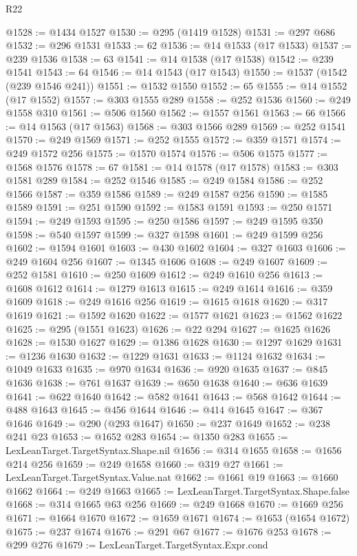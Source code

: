 \begin{lexlean}{R22}
\begin{coremodule}
@1528 := @1434 @1527
@1530 := @295 (@1419 @1528)
@1531 := @297 @686
@1532 := @296 @1531
@1533 := 62
@1536 := @14 @1533 (@17 @1533)
@1537 := @239 @1536
@1538 := 63
@1541 := @14 @1538 (@17 @1538)
@1542 := @239 @1541
@1543 := 64
@1546 := @14 @1543 (@17 @1543)
@1550 := @1537 (@1542 (@239 @1546 @241))
@1551 := @1532 @1550
@1552 := 65
@1555 := @14 @1552 (@17 @1552)
@1557 := @303 @1555 @289
@1558 := @252 @1536
@1560 := @249 @1558 @310
@1561 := @506 @1560
@1562 := @1557 @1561
@1563 := 66
@1566 := @14 @1563 (@17 @1563)
@1568 := @303 @1566 @289
@1569 := @252 @1541
@1570 := @249 @1569
@1571 := @252 @1555
@1572 := @359 @1571
@1574 := @249 @1572 @256
@1575 := @1570 @1574
@1576 := @506 @1575
@1577 := @1568 @1576
@1578 := 67
@1581 := @14 @1578 (@17 @1578)
@1583 := @303 @1581 @289
@1584 := @252 @1546
@1585 := @249 @1584
@1586 := @252 @1566
@1587 := @359 @1586
@1589 := @249 @1587 @256
@1590 := @1585 @1589
@1591 := @251 @1590
@1592 := @1583 @1591
@1593 := @250 @1571
@1594 := @249 @1593
@1595 := @250 @1586
@1597 := @249 @1595 @350
@1598 := @540 @1597
@1599 := @327 @1598
@1601 := @249 @1599 @256
@1602 := @1594 @1601
@1603 := @430 @1602
@1604 := @327 @1603
@1606 := @249 @1604 @256
@1607 := @1345 @1606
@1608 := @249 @1607
@1609 := @252 @1581
@1610 := @250 @1609
@1612 := @249 @1610 @256
@1613 := @1608 @1612
@1614 := @1279 @1613
@1615 := @249 @1614
@1616 := @359 @1609
@1618 := @249 @1616 @256
@1619 := @1615 @1618
@1620 := @317 @1619
@1621 := @1592 @1620
@1622 := @1577 @1621
@1623 := @1562 @1622
@1625 := @295 (@1551 @1623)
@1626 := @22 @294
@1627 := @1625 @1626
@1628 := @1530 @1627
@1629 := @1386 @1628
@1630 := @1297 @1629
@1631 := @1236 @1630
@1632 := @1229 @1631
@1633 := @1124 @1632
@1634 := @1049 @1633
@1635 := @970 @1634
@1636 := @920 @1635
@1637 := @845 @1636
@1638 := @761 @1637
@1639 := @650 @1638
@1640 := @636 @1639
@1641 := @622 @1640
@1642 := @582 @1641
@1643 := @568 @1642
@1644 := @488 @1643
@1645 := @456 @1644
@1646 := @414 @1645
@1647 := @367 @1646
@1649 := @290 (@293 @1647)
@1650 := @237 @1649
@1652 := @238 @241 @23
@1653 := @1652 @283
@1654 := @1350 @283
@1655 := LexLeanTarget.TargetSyntax.Shape.nil
@1656 := @314 @1655
@1658 := @1656 @214 @256
@1659 := @249 @1658
@1660 := @319 @27
@1661 := LexLeanTarget.TargetSyntax.Value.nat
@1662 := @1661 @19
@1663 := @1660 @1662
@1664 := @249 @1663
@1665 := LexLeanTarget.TargetSyntax.Shape.false
@1668 := @314 @1665 @63 @256
@1669 := @249 @1668
@1670 := @1669 @256
@1671 := @1664 @1670
@1672 := @1659 @1671
@1674 := @1653 (@1654 @1672)
@1675 := @237 @1674
@1676 := @291 @67
@1677 := @1676 @253
@1678 := @299 @276
@1679 := LexLeanTarget.TargetSyntax.Expr.cond

\end{coremodule}
\end{lexlean}
